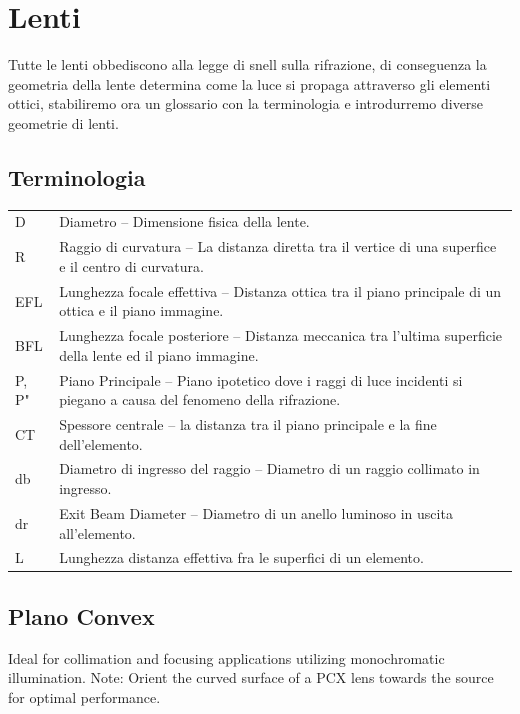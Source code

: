 \section{Lenti}
Tutte le lenti obbediscono alla legge di snell sulla rifrazione, di conseguenza la geometria della lente determina come la luce si propaga attraverso gli elementi ottici, stabiliremo ora un glossario con la terminologia e introdurremo diverse geometrie di lenti.

\subsection{Terminologia}

\begin{tabularx}{\textwidth}{l p{}}

D               & 	Diametro – Dimensione fisica della lente.\\
R               &	Raggio di curvatura – La distanza diretta tra il vertice di una superfice e il centro di curvatura.\\
EFL 	        &   Lunghezza focale effettiva – Distanza ottica tra il piano principale di un ottica e il piano immagine.\\
BFL 	        &   Lunghezza focale posteriore – Distanza meccanica tra l'ultima superficie della lente ed il piano immagine.\\
P, P" 	        &   Piano Principale – Piano ipotetico dove i raggi di luce incidenti si piegano a causa del fenomeno della rifrazione.\\
CT              & 	Spessore centrale – la distanza tra il piano principale e la fine dell'elemento.\\
db 	            &   Diametro di ingresso del raggio – Diametro di un raggio collimato in ingresso.\\
dr 	            &   Exit Beam Diameter – Diametro di un anello luminoso in uscita all'elemento.\\
L 	            &   Lunghezza distanza effettiva fra le superfici di un elemento.
\end{tabularx}

\subsection{Plano Convex}

Ideal for collimation and focusing applications utilizing monochromatic
illumination. Note: Orient the curved surface of a PCX lens towards the source
for optimal performance.

